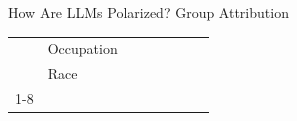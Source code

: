 \documentclass[20pt]{beamer}
\newcommand{\sigyes}{\checked}
\newcommand{\signo}{$\times$}
\begin{document}
\begin{frame}{How Are LLMs Polarized? Group Attribution}
{\begin{tabular}{llcccccc}
				& Occupation & \makebox[1.2em][c]{\signo}\makebox[1.2em][c]{\signo}\makebox[1.2em][c]{\sigyes}\makebox[1.2em][c]{\sigyes}\makebox[1.2em][c]{\sigyes} & \makebox[1.2em][c]{\sigyes}\makebox[1.2em][c]{\sigyes}\makebox[1.2em][c]{\sigyes}\makebox[1.2em][c]{\signo}\makebox[1.2em][c]{\signo} & \makebox[1.2em][c]{$\pm$}\makebox[1.2em][c]{$\pm$}\makebox[1.2em][c]{$\pm$}\makebox[1.2em][c]{\sigyes}\makebox[1.2em][c]{\sigyes} & \makebox[1.2em][c]{\sigyes}\makebox[1.2em][c]{$\pm$}\makebox[1.2em][c]{\sigyes}\makebox[1.2em][c]{\sigyes}\makebox[1.2em][c]{\sigyes} & \makebox[1.2em][c]{\sigyes}\makebox[1.2em][c]{$\pm$}\makebox[1.2em][c]{$\pm$}\makebox[1.2em][c]{\sigyes}\makebox[1.2em][c]{\signo} & \makebox[1.2em][c]{\signo}\makebox[1.2em][c]{\signo}\makebox[1.2em][c]{\sigyes}\makebox[1.2em][c]{\signo}\makebox[1.2em][c]{\signo} \\
				& Race & \makebox[1.2em][c]{\sigyes}\makebox[1.2em][c]{\signo}\makebox[1.2em][c]{\sigyes}\makebox[1.2em][c]{\sigyes}\makebox[1.2em][c]{\sigyes} & \makebox[1.2em][c]{$\pm$}\makebox[1.2em][c]{$\pm$}\makebox[1.2em][c]{$\pm$}\makebox[1.2em][c]{\sigyes}\makebox[1.2em][c]{\sigyes} & \makebox[1.2em][c]{\sigyes}\makebox[1.2em][c]{$\pm$}\makebox[1.2em][c]{$\pm$}\makebox[1.2em][c]{\sigyes}\makebox[1.2em][c]{$\pm$} & \makebox[1.2em][c]{$\pm$}\makebox[1.2em][c]{$\pm$}\makebox[1.2em][c]{\sigyes}\makebox[1.2em][c]{\sigyes}\makebox[1.2em][c]{$\pm$} & \makebox[1.2em][c]{$\pm$}\makebox[1.2em][c]{$\pm$}\makebox[1.2em][c]{\sigyes}\makebox[1.2em][c]{$\pm$}\makebox[1.2em][c]{$\pm$} & \makebox[1.2em][c]{$\pm$}\makebox[1.2em][c]{$\pm$}\makebox[1.2em][c]{$\pm$}\makebox[1.2em][c]{\sigyes}\makebox[1.2em][c]{\sigyes} \\
				\cline{1-8}
			\end{tabular}
		}
	\end{frame}
\end{document}
